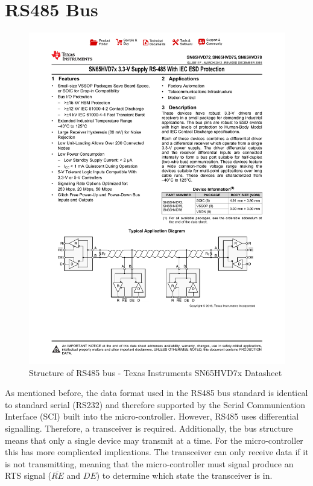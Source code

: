 \section{RS485 Bus}

\begin{figure}[H]
    \centering \includegraphics[width=1.0\textwidth]{./figures/rs485_structure.pdf}
    \caption{Structure of RS485 bus - Texas Instruments SN65HVD7x Datasheet\cite{RS485TransceiverDatasheet}}
    \label{fig:rs485_structure}
\end{figure}

As mentioned before, the data format used in the RS485 bus standard is identical to standard serial (RS232) and therefore supported by the Serial Communication Interface (SCI) built into the micro-controller. However, RS485 uses differential signalling. Therefore, a transceiver is required. Additionally, the bus structure means that only a single device may transmit at a time. For the micro-controller this has more complicated implications. The transceiver can only receive data if it is not transmitting, meaning that the micro-controller must signal produce an RTS signal ($\overline{RE}$ and $DE$) to determine which state the transceiver is in.

